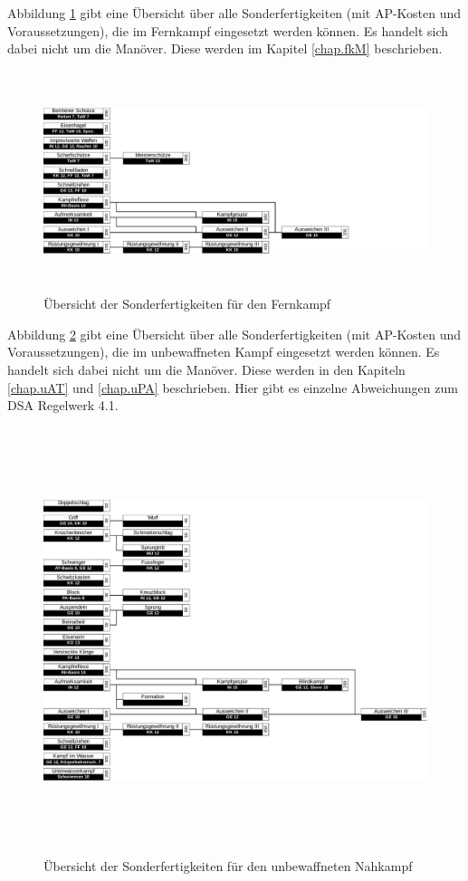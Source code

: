 Abbildung \ref{fig.fSF} gibt eine Übersicht über alle Sonderfertigkeiten (mit AP-Kosten und Voraussetzungen), die im Fernkampf eingesetzt werden können.
Es handelt sich dabei nicht um die Manöver. Diese werden im Kapitel \ref{chap.fkM} beschrieben.

\begin{figure}
    \centering
    \includegraphics[width=16.93cm,height=6.454cm]{fig/fkSF.pdf}
    \caption{Übersicht der Sonderfertigkeiten für den Fernkampf}
    \label{fig.fSF}
\end{figure}

Abbildung \ref{fig.uSF} gibt eine Übersicht über alle Sonderfertigkeiten (mit AP-Kosten und Voraussetzungen), die im unbewaffneten Kampf eingesetzt werden können.
Es handelt sich dabei nicht um die Manöver.
Diese werden in den Kapiteln \ref{chap.uAT} und \ref{chap.uPA} beschrieben.
Hier gibt es einzelne Abweichungen zum DSA Regelwerk 4.1.

\begin{figure}
    \centering
    \includegraphics[width=16.976cm,height=12.437cm]{fig/uSF.pdf}
    \caption{Übersicht der Sonderfertigkeiten für den unbewaffneten Nahkampf}
    \label{fig.uSF}
\end{figure}

